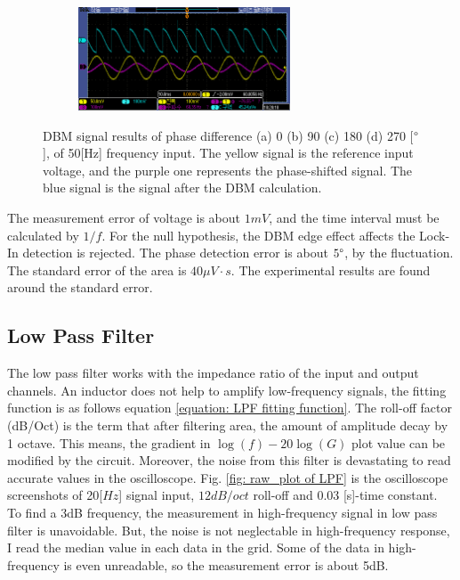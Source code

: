 \documentclass{article}
\begin{document}
\begin{figure}[ht]
\begin{subfigure}[b]{6.3cm}
  \centering
  \includegraphics[width=6.3cm]{../raw_data/TEK00358.PNG}
  \caption{}
\end{subfigure}
\hfill
  \caption{DBM signal results of phase difference (a) 0 (b) 90 (c) 180 (d) 270 [$\degree$], of 50[Hz] frequency input.
      The yellow signal is the reference input voltage, and the purple one represents the phase-shifted signal.
      The blue signal is the signal after the DBM calculation.
   }
  \label{fig: DBM_plot}
\end{figure}

The measurement error of voltage is about $1mV$, and the time interval must be calculated by $1/f$.
For the null hypothesis, the DBM edge effect affects the Lock-In detection is rejected.
The phase detection error is about $5 \degree$, by the fluctuation.
The standard error of the area is $40 \mu V \cdot s$.
The experimental results are found around the standard error.



\subsection{Low Pass Filter}
\label{results: low pass filter}

 The low pass filter works with the impedance ratio of the input and output channels.
 An inductor does not help to amplify low-frequency signals, the fitting function is as follows equation \ref{equation: LPF fitting function}.
 The roll-off factor (dB/Oct) is the term that after filtering area, the amount of amplitude decay by 1 octave.
 This means, the gradient in $\log(f) - 20\log(G)$ plot value can be modified by the circuit.
 Moreover, the noise from this filter is devastating to read accurate values in the oscilloscope.
 Fig. \ref{fig: raw_plot of LPF} is the oscilloscope screenshots of 20[$Hz$] signal input, $12 dB/oct$ roll-off and 0.03 [s]-time constant.
 To find a 3dB frequency, the measurement in high-frequency signal in low pass filter is unavoidable.
 But, the noise is not neglectable in high-frequency response, I read the median value in each data in the grid.
 Some of the data in high-frequency is even unreadable, so the measurement error is about 5dB.
\end{document}
